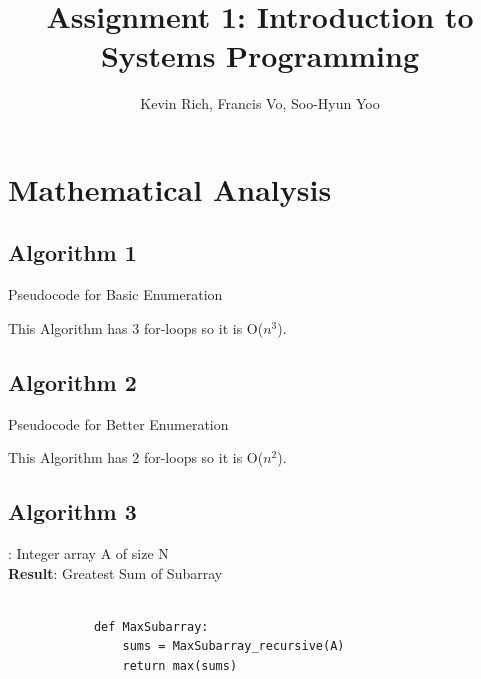 \documentclass[a4paper,10pt]{article}
\title{Assignment 1: Introduction to Systems Programming}
\author{Kevin Rich, Francis Vo, Soo-Hyun Yoo}
\begin{document}
	\maketitle

	\section{Mathematical Analysis}
		\subsection{Algorithm 1}
			\begin{algorithm}[H]
				\SetAlgoLined
				\LinesNumbered
				\DontPrintSemicolon
			\caption{Pseudocode for Basic Enumeration}
			\end{algorithm}
			This Algorithm has 3 for-loops so it is O($n^3$).
		\subsection{Algorithm 2}
			\begin{algorithm}[H]
				\SetAlgoLined
				\LinesNumbered
				\DontPrintSemicolon
			\caption{Pseudocode for Better Enumeration}
			\end{algorithm}
			This Algorithm has 2 for-loops so it is O($n^2$).
		\subsection{Algorithm 3}
			: Integer array A of size N \\
			{\bf Result}: Greatest Sum of Subarray

			\begin{minipage}[!h]{6in}
			\begin{verbatim}

			def MaxSubarray:
			    sums = MaxSubarray_recursive(A)
			    return max(sums)
			\end{verbatim}
			\end{minipage}
\end{document}
